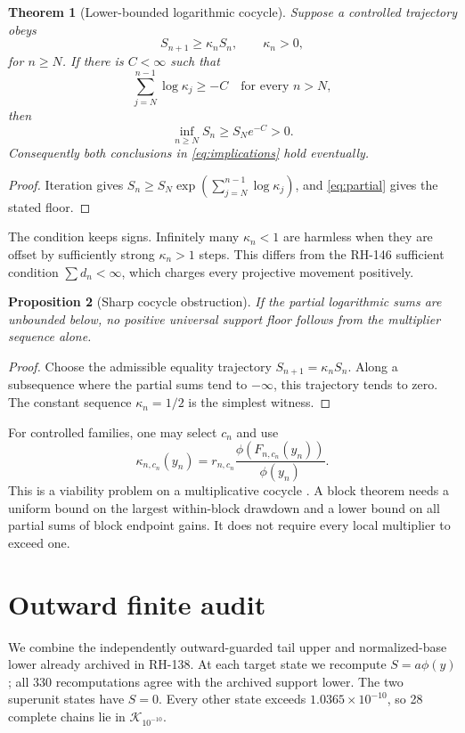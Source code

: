 \documentclass[12pt]{article}
\newtheorem{theorem}{Theorem}
\newtheorem{proposition}[theorem]{Proposition}
\begin{document}
\begin{theorem}[Lower-bounded logarithmic cocycle]\label{thm:cocycle}
Suppose a controlled trajectory obeys
\[
 S_{n+1}\geq\kappa_nS_n,
 \qquad \kappa_n>0,
\]
for $n\geq N$.  If there is $C<\infty$ such that
\begin{equation}\label{eq:partial}
 \sum_{j=N}^{n-1}\log\kappa_j\geq-C
 \quad\text{for every }n>N,
\end{equation}
then
\[
 \inf_{n\geq N}S_n\geq S_Ne^{-C}>0.
\]
Consequently both conclusions in \eqref{eq:implications} hold eventually.
\end{theorem}
\begin{proof}
Iteration gives
$S_n\geq S_N\exp(\sum_{j=N}^{n-1}\log\kappa_j)$, and
\eqref{eq:partial} gives the stated floor.
\end{proof}

The condition keeps signs.  Infinitely many $\kappa_n<1$ are harmless when
they are offset by sufficiently strong $\kappa_n>1$ steps.  This differs
from the RH-146 sufficient condition $\sum d_n<\infty$, which charges every
projective movement positively.

\begin{proposition}[Sharp cocycle obstruction]\label{prop:sharp}
If the partial logarithmic sums are unbounded below, no positive universal
support floor follows from the multiplier sequence alone.
\end{proposition}
\begin{proof}
Choose the admissible equality trajectory
$S_{n+1}=\kappa_nS_n$.  Along a subsequence where the partial sums tend to
$-\infty$, this trajectory tends to zero.  The constant sequence
$\kappa_n=1/2$ is the simplest witness.
\end{proof}

For controlled families, one may select $c_n$ and use
\[
 \kappa_{n,c_n}(y_n)
 =r_{n,c_n}\frac{\phi(F_{n,c_n}(y_n))}{\phi(y_n)}.
\]
This is a viability problem on a multiplicative cocycle
\citep{Aubin1991,Strogatz2018}.  A block theorem needs a uniform bound on the
largest within-block drawdown and a lower bound on all partial sums of block
endpoint gains.  It does not require every local multiplier to exceed one.

\section{Outward finite audit}
We combine the independently outward-guarded tail upper and normalized-base
lower already archived in RH-138.  At each target state we recompute
$S=a\phi(y)$; all 330 recomputations agree with the archived support lower.
The two superunit states have $S=0$.  Every other state exceeds
$1.0365\times10^{-10}$, so 28 complete chains lie in
$\mathcal K_{10^{-10}}$.
\end{document}
